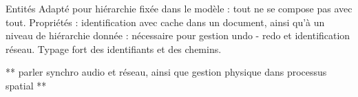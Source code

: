 \begin{block}{Entités}
Adapté pour hiérarchie fixée dans le modèle : tout ne se compose pas avec tout.
Propriétés : identification avec cache dans un document, ainsi qu'à un niveau de hiérarchie donnée : nécessaire pour gestion undo - redo et identification réseau.
Typage fort des identifiants et des chemins.

** parler synchro audio et réseau, ainsi que gestion physique dans processus spatial **
\end{block}